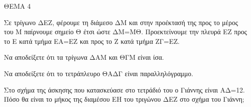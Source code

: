 
ΘΕΜΑ 4

Σε τρίγωνο ΔΕΖ, φέρουμε τη διάμεσο ΔΜ και στην προέκτασή της προς το μέρος του Μ παίρνουμε σημείο Θ έτσι ώστε ΔΜ=ΜΘ. Προεκτείνουμε την πλευρά ΕΖ προς το Ε κατά τμήμα ΕΑ=ΕΖ και προς το Ζ κατά τμήμα ΖΓ=ΕΖ.

\begin{alist}
\item Να αποδείξετε ότι τα τρίγωνα ΔΑΜ και ΘΓΜ είναι ίσα. 

\item Να αποδείξετε ότι το τετράπλευρο ΘΑΔΓ είναι παραλληλόγραμμο. 

\item Στο σχήμα της άσκησης που κατασκεύασε στο τετράδιό του ο Γιάννης είναι ΑΔ=12. Πόσο θα είναι το μήκος της διαμέσου ΕΗ του τριγώνου ΔΕΖ στο σχήμα του Γιάννη; 
\end{alist}
